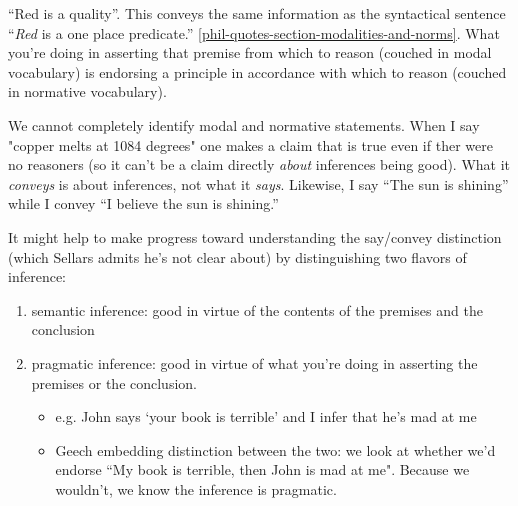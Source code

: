 ``Red is a quality''. This conveys the same information as the syntactical sentence ``\textit{Red} is a one place predicate.'' \ref{phil-quotes-section-modalities-and-norms}. What you're doing in asserting that premise from which to reason (couched in modal vocabulary) is endorsing a principle in accordance with which to reason (couched in normative vocabulary).

We cannot completely identify modal and normative statements. When I say "copper melts at 1084 degrees" one makes a claim that is true even if ther were no reasoners (so it can't be a claim directly \emph{about} inferences being good). What it \emph{conveys} is about inferences, not what it \emph{says}. Likewise, I say ``The sun is shining'' while I convey ``I believe the sun is shining.''

It might help to make progress toward understanding the say/convey distinction (which Sellars admits he's not clear about) by distinguishing two flavors of inference:
\begin{enumerate}
\item semantic inference: good in virtue of the contents of the premises and the conclusion
\item pragmatic inference: good in virtue of what you're doing in asserting the premises or the conclusion.
 \begin{itemize}
 \item e.g. John says `your book is terrible' and I infer that he's mad at me
 \item Geech embedding distinction between the two: we look at whether we'd endorse ``My book is terrible, then John is mad at me". Because we wouldn't, we know the inference is pragmatic.

 \end{itemize}
\end{enumerate}